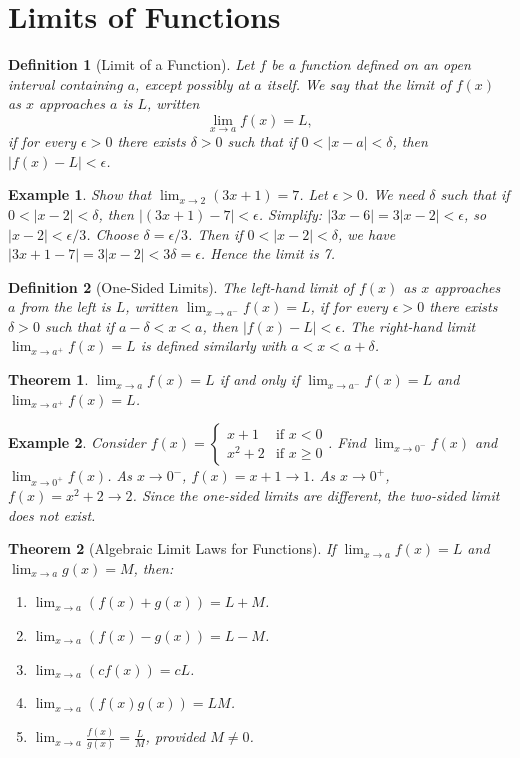 \documentclass[11pt,a4paper]{article}
\newtheorem{example}{Example}
\newtheorem{theorem}{Theorem}
\newtheorem{definition}{Definition}
\begin{document}
\section{Limits of Functions}
\begin{definition}[Limit of a Function]
Let $f$ be a function defined on an open interval containing $a$, except possibly at $a$ itself. We say that the \textit{limit of $f(x)$ as $x$ approaches $a$} is $L$, written
\[
\lim_{x \to a} f(x) = L,
\]
if for every $\epsilon > 0$ there exists $\delta > 0$ such that if $0 < |x - a| < \delta$, then $|f(x) - L| < \epsilon$.
\end{definition}
\begin{example}
Show that $\displaystyle \lim_{x \to 2} (3x + 1) = 7$.
Let $\epsilon > 0$. We need $\delta$ such that if $0 < |x - 2| < \delta$, then $|(3x+1) - 7| < \epsilon$. Simplify: $|3x - 6| = 3|x - 2| < \epsilon$, so $|x - 2| < \epsilon/3$. Choose $\delta = \epsilon/3$. Then if $0 < |x - 2| < \delta$, we have $|3x + 1 - 7| = 3|x - 2| < 3\delta = \epsilon$. Hence the limit is 7.
\end{example}
\begin{definition}[One-Sided Limits]
The \textit{left-hand limit} of $f(x)$ as $x$ approaches $a$ from the left is $L$, written $\lim_{x \to a^-} f(x) = L$, if for every $\epsilon > 0$ there exists $\delta > 0$ such that if $a - \delta < x < a$, then $|f(x) - L| < \epsilon$. The \textit{right-hand limit} $\lim_{x \to a^+} f(x) = L$ is defined similarly with $a < x < a + \delta$.
\end{definition}
\begin{theorem}
$\displaystyle \lim_{x \to a} f(x) = L$ if and only if $\displaystyle \lim_{x \to a^-} f(x) = L$ and $\displaystyle \lim_{x \to a^+} f(x) = L$.
\end{theorem}
\begin{example}
Consider $f(x) = \begin{cases} x + 1 & \text{if } x < 0 \\ x^2 + 2 & \text{if } x \geq 0 \end{cases}$. Find $\lim_{x \to 0^-} f(x)$ and $\lim_{x \to 0^+} f(x)$.
As $x \to 0^-$, $f(x) = x + 1 \to 1$. As $x \to 0^+$, $f(x) = x^2 + 2 \to 2$. Since the one-sided limits are different, the two-sided limit does not exist.
\end{example}
\begin{theorem}[Algebraic Limit Laws for Functions]
If $\lim_{x \to a} f(x) = L$ and $\lim_{x \to a} g(x) = M$, then:
\begin{enumerate}
\item $\lim_{x \to a} (f(x) + g(x)) = L + M$.
\item $\lim_{x \to a} (f(x) - g(x)) = L - M$.
\item $\lim_{x \to a} (c f(x)) = c L$.
\item $\lim_{x \to a} (f(x) g(x)) = L M$.
\item $\displaystyle \lim_{x \to a} \frac{f(x)}{g(x)} = \frac{L}{M}$, provided $M \neq 0$.
\end{enumerate}
\end{theorem}
\end{document}

